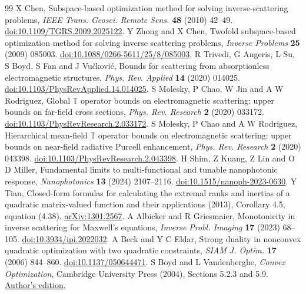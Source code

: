\documentclass[anonymous,12pt]{iopjournal}
\theoremstyle{remark}\newtheorem{remark}[theorem]{Remark}
\numberwithin{equation}{section}
\begin{document}
\begin{thebibliography}{99}\setlength{\itemsep}{1pt}\setlength{\parsep}{0pt}
 X Chen, Subspace-based optimization method for solving inverse-scattering problems, \emph{IEEE Trans. Geosci. Remote Sens.} \textbf{48} (2010) 42--49. \href{https://doi.org/10.1109/TGRS.2009.2025122}{doi:10.1109/TGRS.2009.2025122}.
 Y Zhong and X Chen, Twofold subspace-based optimization method for solving inverse scattering problems, \emph{Inverse Problems} \textbf{25} (2009) 085003. \href{https://doi.org/10.1088/0266-5611/25/8/085003}{doi:10.1088/0266-5611/25/8/085003}.
 R Trivedi, G Angeris, L Su, S Boyd, S Fan and J Vu\v{c}kovi\'c, Bounds for scattering from absorptionless electromagnetic structures, \emph{Phys. Rev. Applied} \textbf{14} (2020) 014025. \href{https://doi.org/10.1103/PhysRevApplied.14.014025}{doi:10.1103/PhysRevApplied.14.014025}.
 S Molesky, P Chao, W Jin and A W Rodriguez, Global $\mathbb T$ operator bounds on electromagnetic scattering: upper bounds on far-field cross sections, \emph{Phys. Rev. Research} \textbf{2} (2020) 033172. \href{https://doi.org/10.1103/PhysRevResearch.2.033172}{doi:10.1103/PhysRevResearch.2.033172}.
 S Molesky, P Chao and A W Rodriguez, Hierarchical mean-field $\mathbb T$ operator bounds on electromagnetic scattering: upper bounds on near-field radiative Purcell enhancement, \emph{Phys. Rev. Research} \textbf{2} (2020) 043398. \href{https://doi.org/10.1103/PhysRevResearch.2.043398}{doi:10.1103/PhysRevResearch.2.043398}.
 H Shim, Z Kuang, Z Lin and O D Miller, Fundamental limits to multi-functional and tunable nanophotonic response, \emph{Nanophotonics} \textbf{13} (2024) 2107--2116. \href{https://doi.org/10.1515/nanoph-2023-0630}{doi:10.1515/nanoph-2023-0630}.
 Y Tian, Closed-form formulas for calculating the extremal ranks and inertias of a quadratic matrix-valued function and their applications (2013), Corollary 4.5, equation (4.38). \href{https://arxiv.org/abs/1301.2567}{arXiv:1301.2567}.
 A Albicker and R Griesmaier, Monotonicity in inverse scattering for Maxwell's equations, \emph{Inverse Probl. Imaging} \textbf{17} (2023) 68--105. \href{https://doi.org/10.3934/ipi.2022032}{doi:10.3934/ipi.2022032}.
 A Beck and Y C Eldar, Strong duality in nonconvex quadratic optimization with two quadratic constraints, \emph{SIAM J. Optim.} \textbf{17} (2006) 844--860. \href{https://doi.org/10.1137/050644471}{doi:10.1137/050644471}.
 S Boyd and L Vandenberghe, \emph{Convex Optimization}, Cambridge University Press (2004), Sections 5.2.3 and 5.9. \href{https://web.stanford.edu/~boyd/cvxbook/}{Author's edition}.

\end{thebibliography}
\end{document}
